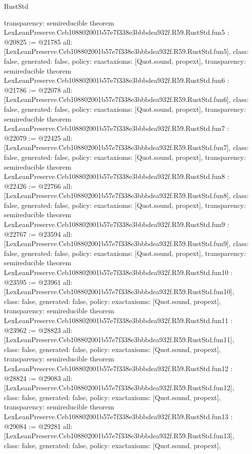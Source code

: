 \begin{lexlean}{RustStd}
\begin{coremodule}
{  transparency: semireducible
}
theorem LexLeanPreserve.Ceb108802001b57e7f338e3bbbdea932f.R59.RustStd.fun5 : @20825 := @21785 {
  all: [LexLeanPreserve.Ceb108802001b57e7f338e3bbbdea932f.R59.RustStd.fun5],
  class: false,
  generated: false,
  policy: exact{axioms: [Quot.sound, propext]},
  transparency: semireducible
}
theorem LexLeanPreserve.Ceb108802001b57e7f338e3bbbdea932f.R59.RustStd.fun6 : @21786 := @22078 {
  all: [LexLeanPreserve.Ceb108802001b57e7f338e3bbbdea932f.R59.RustStd.fun6],
  class: false,
  generated: false,
  policy: exact{axioms: [Quot.sound, propext]},
  transparency: semireducible
}
theorem LexLeanPreserve.Ceb108802001b57e7f338e3bbbdea932f.R59.RustStd.fun7 : @22079 := @22425 {
  all: [LexLeanPreserve.Ceb108802001b57e7f338e3bbbdea932f.R59.RustStd.fun7],
  class: false,
  generated: false,
  policy: exact{axioms: [Quot.sound, propext]},
  transparency: semireducible
}
theorem LexLeanPreserve.Ceb108802001b57e7f338e3bbbdea932f.R59.RustStd.fun8 : @22426 := @22766 {
  all: [LexLeanPreserve.Ceb108802001b57e7f338e3bbbdea932f.R59.RustStd.fun8],
  class: false,
  generated: false,
  policy: exact{axioms: [Quot.sound, propext]},
  transparency: semireducible
}
theorem LexLeanPreserve.Ceb108802001b57e7f338e3bbbdea932f.R59.RustStd.fun9 : @22767 := @23594 {
  all: [LexLeanPreserve.Ceb108802001b57e7f338e3bbbdea932f.R59.RustStd.fun9],
  class: false,
  generated: false,
  policy: exact{axioms: [Quot.sound, propext]},
  transparency: semireducible
}
theorem LexLeanPreserve.Ceb108802001b57e7f338e3bbbdea932f.R59.RustStd.fun10 : @23595 := @23961 {
  all: [LexLeanPreserve.Ceb108802001b57e7f338e3bbbdea932f.R59.RustStd.fun10],
  class: false,
  generated: false,
  policy: exact{axioms: [Quot.sound, propext]},
  transparency: semireducible
}
theorem LexLeanPreserve.Ceb108802001b57e7f338e3bbbdea932f.R59.RustStd.fun11 : @23962 := @28823 {
  all: [LexLeanPreserve.Ceb108802001b57e7f338e3bbbdea932f.R59.RustStd.fun11],
  class: false,
  generated: false,
  policy: exact{axioms: [Quot.sound, propext]},
  transparency: semireducible
}
theorem LexLeanPreserve.Ceb108802001b57e7f338e3bbbdea932f.R59.RustStd.fun12 : @28824 := @29083 {
  all: [LexLeanPreserve.Ceb108802001b57e7f338e3bbbdea932f.R59.RustStd.fun12],
  class: false,
  generated: false,
  policy: exact{axioms: [Quot.sound, propext]},
  transparency: semireducible
}
theorem LexLeanPreserve.Ceb108802001b57e7f338e3bbbdea932f.R59.RustStd.fun13 : @29084 := @29281 {
  all: [LexLeanPreserve.Ceb108802001b57e7f338e3bbbdea932f.R59.RustStd.fun13],
  class: false,
  generated: false,
  policy: exact{axioms: [Quot.sound, propext]},
}
\end{coremodule}
\end{lexlean}
